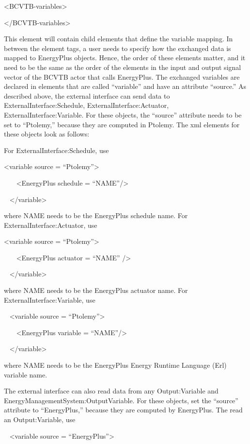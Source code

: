 \textless{}BCVTB-variables\textgreater{}

\textless{}/BCVTB-variables\textgreater{}

This element will contain child elements that define the variable mapping. In between the element tags, a user needs to specify how the exchanged data is mapped to EnergyPlus objects. Hence, the order of these elements matter, and it need to be the same as the order of the elements in the input and output signal vector of the BCVTB actor that calls EnergyPlus. The exchanged variables are declared in elements that are called ``variable'' and have an attribute ``source.'' As described above, the external interface can send data to ExternalInterface:Schedule, ExternalInterface:Actuator, ExternalInterface:Variable. For these objects, the ``source'' attribute needs to be set to ``Ptolemy,'' because they are computed in Ptolemy. The xml elements for these objects look as follows:

For ExternalInterface:Schedule, use

\textless{}variable source = ``Ptolemy''\textgreater{}

~~~ \textless{}EnergyPlus schedule = ``NAME''/\textgreater{}

~ \textless{}/variable\textgreater{}

where NAME needs to be the EnergyPlus schedule name. For ExternalInterface:Actuator, use

\textless{}variable source = ``Ptolemy''\textgreater{}

~~~ \textless{}EnergyPlus actuator = ``NAME'' /\textgreater{}

~ \textless{}/variable\textgreater{}

where NAME needs to be the EnergyPlus actuator name. For ExternalInterface:Variable, use

~ \textless{}variable source = ``Ptolemy''\textgreater{}

~~~ \textless{}EnergyPlus variable = ``NAME''/\textgreater{}

~ \textless{}/variable\textgreater{}

where NAME needs to be the EnergyPlus Energy Runtime Language (Erl) variable name.

The external interface can also read data from any Output:Variable and EnergyManagementSystem:OutputVariable. For these objects, set the ``source'' attribute to ``EnergyPlus,'' because they are computed by EnergyPlus. The read an Output:Variable, use

~ \textless{}variable source = ``EnergyPlus''\textgreater{}

